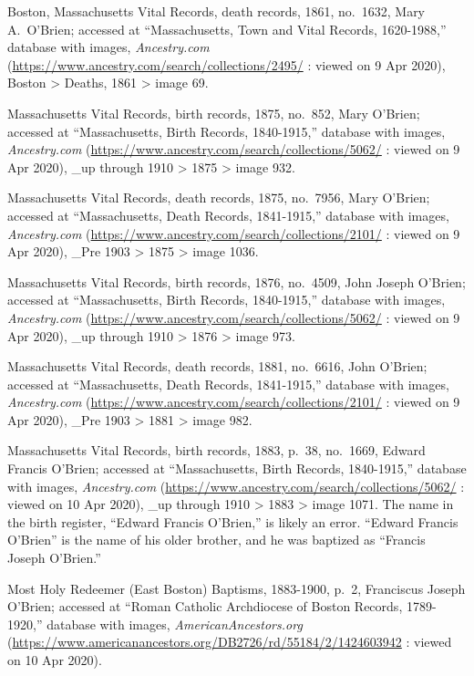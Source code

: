 \begin{thebibliography}{999}
Boston, Massachusetts Vital Records, death records, 1861, no.\ 1632, Mary A.\ O'Brien; accessed at ``Massachusetts, Town and Vital Records, 1620-1988,'' database with images, \textit{Ancestry.com} (\url{https://www.ancestry.com/search/collections/2495/} : viewed on 9 Apr 2020), Boston > Deaths, 1861 > image 69.

Massachusetts Vital Records, birth records, 1875, no.\ 852, Mary O'Brien; accessed at ``Massachusetts, Birth Records, 1840-1915,'' database with images, \textit{Ancestry.com} (\url{https://www.ancestry.com/search/collections/5062/} : viewed on 9 Apr 2020), \_up through 1910 > 1875 > image 932.

Massachusetts Vital Records, death records, 1875, no.\ 7956, Mary O'Brien; accessed at ``Massachusetts, Death Records, 1841-1915,'' database with images, \textit{Ancestry.com} (\url{https://www.ancestry.com/search/collections/2101/} : viewed on 9 Apr 2020), \_Pre 1903 > 1875 > image 1036.

Massachusetts Vital Records, birth records, 1876, no.\ 4509, John Joseph O'Brien; accessed at ``Massachusetts, Birth Records, 1840-1915,'' database with images, \textit{Ancestry.com} (\url{https://www.ancestry.com/search/collections/5062/} : viewed on 9 Apr 2020), \_up through 1910 > 1876 > image 973.

Massachusetts Vital Records, death records, 1881, no.\ 6616, John O'Brien; accessed at ``Massachusetts, Death Records, 1841-1915,'' database with images, \textit{Ancestry.com} (\url{https://www.ancestry.com/search/collections/2101/} : viewed on 9 Apr 2020), \_Pre 1903 > 1881 > image 982.

Massachusetts Vital Records, birth records, 1883, p.\ 38, no.\ 1669, Edward Francis O'Brien; accessed at ``Massachusetts, Birth Records, 1840-1915,'' database with images, \textit{Ancestry.com} (\url{https://www.ancestry.com/search/collections/5062/} : viewed on 10 Apr 2020), \_up through 1910 > 1883 > image 1071. The name in the birth register, ``Edward Francis O'Brien,'' is likely an error. ``Edward Francis O'Brien'' is the name of his older brother, and he was baptized as ``Francis Joseph O'Brien.''

Most Holy Redeemer (East Boston) Baptisms, 1883-1900, p.\ 2, Franciscus Joseph O'Brien; accessed at ``Roman Catholic Archdiocese of Boston Records, 1789-1920,'' database with images, \textit{AmericanAncestors.org} (\url{https://www.americanancestors.org/DB2726/rd/55184/2/1424603942} : viewed on 10 Apr 2020).


\end{thebibliography}
